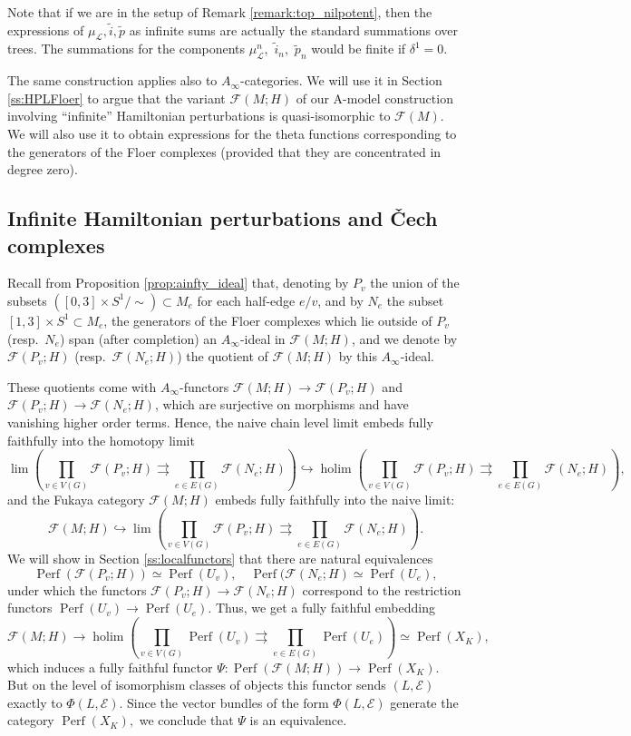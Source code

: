 \documentclass[11pt,leqno]{amsart}
\numberwithin{equation}{section}
\def\F{{\mathcal F}}
\DeclareMathOperator*{\holim}{holim}
\newcommand{\hto}{\hookrightarrow}
\newcommand{\prarr}{\rightrightarrows}
\newcommand{\cF}{{\mathcal F}}
\newcommand{\cL}{{\mathcal L}}
\newcommand{\cE}{{\mathcal E}}
\newcommand{\Perf}{\operatorname{Perf}}
\begin{document}
Note that if we are in the setup of Remark \ref{remark:top_nilpotent}, then the expressions of $\mu_{\cL},\tilde{i},\tilde{p}$ as infinite sums are actually the standard summations over trees. The summations for the components $\mu_{\cL}^n,$ $\tilde{i}_n,$ $\tilde{p}_n$ would be finite if $\delta^1=0.$

The same construction applies also to $A_{\infty}$-categories. We will use it
in Section \ref{ss:HPLFloer} to argue that
the variant $\F(M;H)$ of our A-model construction involving
``infinite'' Hamiltonian perturbations is quasi-isomorphic to $\F(M)$. 
We will also use it to obtain expressions for the theta functions corresponding to the generators of the Floer complexes (provided that they are concentrated in degree zero). 

\subsection{Infinite Hamiltonian perturbations and \v{C}ech complexes}

Recall from Proposition \ref{prop:ainfty_ideal} that, denoting by $P_v$ the
union of the subsets $([0,3]\times S^1/\sim)\subset M_e$ for each half-edge
$e/v$, and by $N_e$ the subset $[1,3]\times S^1\subset M_e$, the generators
of the Floer complexes which lie outside of $P_v$ (resp.\ $N_e$) span (after
completion) an $A_\infty$-ideal in $\cF(M;H)$, and we denote by $\cF(P_v;H)$
(resp.\ $\cF(N_e;H)$) the quotient of $\cF(M;H)$ by this $A_\infty$-ideal.

These quotients come with $A_\infty$-functors $\cF(M;H)\to \cF(P_v;H)$ and $\cF(P_v;H)\to
\cF(N_e;H)$, which are surjective on morphisms and have vanishing higher order
terms. Hence, the naive chain level limit embeds fully faithfully into the homotopy limit $$\lim(\prod\limits_{v\in V(G)}\cF(P_v;H)\prarr\prod\limits_{e\in E(G)}\cF(N_e;H))\hto \holim(\prod\limits_{v\in V(G)}\cF(P_v;H)\prarr\prod\limits_{e\in E(G)}\cF(N_e;H)),$$ 
and the Fukaya category $\cF(M;H)$ embeds fully faithfully into the naive limit:
$$\cF(M;H)\hto \lim(\prod\limits_{v\in V(G)}\cF(P_v;H)\prarr\prod\limits_{e\in E(G)}\cF(N_e;H)).$$ 
We will show in Section \ref{ss:localfunctors} that there are natural equivalences
$$\Perf(\cF(P_v;H))\simeq \Perf(U_v),\quad \Perf(\cF(N_e;H)\simeq \Perf(U_e),$$ under which the functors $\cF(P_v;H)\to \cF(N_e;H)$ correspond to the restriction functors $\Perf(U_v)\to \Perf(U_e)$. 
Thus, we get a fully faithful embedding
$$\cF(M;H)\to\holim(\prod\limits_{v\in V(G)}\Perf(U_v)\prarr\prod\limits_{e\in E(G)}\Perf(U_e))\simeq \Perf(X_K),$$
which induces a fully faithful functor $\Psi:\Perf(\cF(M;H))\to \Perf(X_K)$. 
But on the level of isomorphism classes of objects this functor sends $(L,\cE)$ exactly to $\Phi(L,\cE)$. 
Since the vector bundles of the form $\Phi(L,\cE)$ generate the category $\Perf(X_K),$ we conclude that $\Psi$ is an equivalence.          
\end{document}
